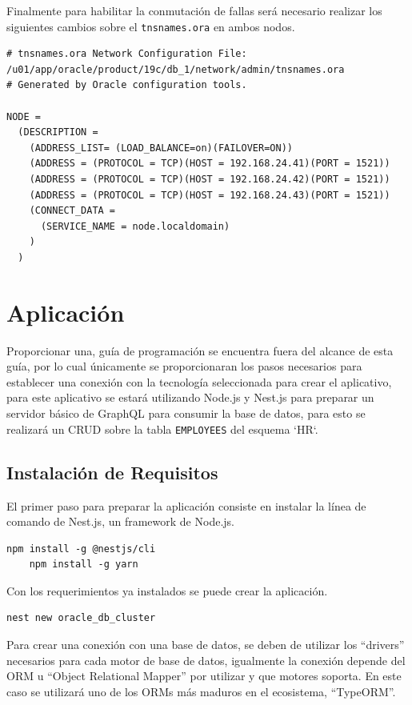 \documentclass{article}
\begin{document}
Finalmente para habilitar la conmutación de fallas será necesario realizar los siguientes cambios sobre el \texttt{tnsnames.ora} en ambos nodos.


\begin{lstlisting}[style=mystyle]
# tnsnames.ora Network Configuration File: /u01/app/oracle/product/19c/db_1/network/admin/tnsnames.ora
# Generated by Oracle configuration tools.

NODE =
  (DESCRIPTION =
    (ADDRESS_LIST= (LOAD_BALANCE=on)(FAILOVER=ON))
    (ADDRESS = (PROTOCOL = TCP)(HOST = 192.168.24.41)(PORT = 1521))
    (ADDRESS = (PROTOCOL = TCP)(HOST = 192.168.24.42)(PORT = 1521))
    (ADDRESS = (PROTOCOL = TCP)(HOST = 192.168.24.43)(PORT = 1521))
    (CONNECT_DATA =
      (SERVICE_NAME = node.localdomain)
    )
  )
\end{lstlisting}

\section{Aplicación}

Proporcionar una, guía de programación se encuentra fuera del alcance de esta guía, por lo cual únicamente se proporcionaran los pasos necesarios para establecer una conexión con la tecnología seleccionada para crear el aplicativo, para este aplicativo se estará utilizando Node.js y Nest.js para preparar un servidor básico de GraphQL para consumir la base de datos, para esto se realizará un CRUD sobre la tabla \texttt{EMPLOYEES} del esquema `HR`. 

\subsection{Instalación de Requisitos}

El primer paso para preparar la aplicación consiste en instalar la línea de comando de Nest.js, un framework de Node.js.

\begin{lstlisting}[style=mystyle]
	npm install -g @nestjs/cli
	npm install -g yarn
\end{lstlisting}

Con los requerimientos ya instalados se puede crear la aplicación.

\begin{lstlisting}[style=mystyle]
	nest new oracle_db_cluster
\end{lstlisting}

Para crear una conexión con una base de datos, se deben de utilizar los ``drivers'' necesarios para cada motor de base de datos, igualmente la conexión depende del ORM u ``Object Relational Mapper'' por utilizar y que motores soporta. En este caso se utilizará uno de los ORMs más maduros en el ecosistema, ``TypeORM''. 
\end{document}
